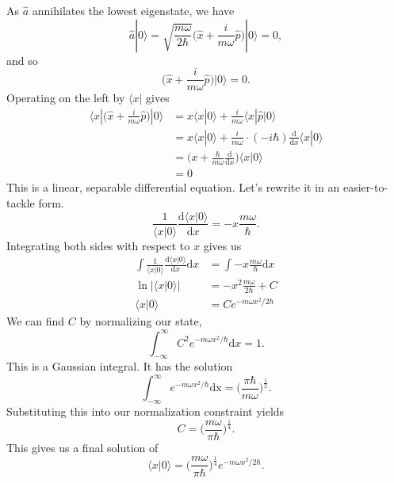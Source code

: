 \documentclass[../qft-for-the-gifted-amateur.tex]{subfiles}
\begin{document}
\begin{questions}
	\begin{solution}
		As $\hat{a}$ annihilates the lowest eigenstate, we have
		\[
			\hat{a}|0\rangle = \sqrt{\frac{m\omega}{2\hbar}}\Big(\hat{x} + \frac{i}{m\omega}\hat{p}\Big)|0\rangle = 0,
		\]
		and so
		\[
			\Big(\hat{x} + \frac{i}{m\omega}\hat{p}\Big)|0\rangle = 0.
		\]
		Operating on the left by $\langle x|$ gives
		\begin{align*}
		\langle x|\Big(\hat{x} + \frac{i}{m\omega}\hat{p}\Big)|0\rangle &= x\langle x|0\rangle + \frac{i}{m\omega}\langle x|\hat{p}|0\rangle \\
		&= x\langle x|0\rangle + \frac{i}{m\omega} \cdot ( - i\hbar)\frac{\mathrm{d}}{\mathrm{d}x}\langle x|0\rangle \\
		&= \Big(x + \frac{\hbar}{m\omega}\frac{\mathrm{d}}{\mathrm{d}x}\Big)\langle x|0\rangle \\
		&= 0
		\end{align*}
		This is a linear, separable differential equation. Let's rewrite it in
		an easier-to-tackle form.
		\[
			\frac{1}{\langle x|0\rangle}\frac{\mathrm{d}\langle x|0\rangle}{\mathrm{d}x} = - x\frac{m\omega}{\hbar}.
		\]
		Integrating both sides with respect to $x$ gives us
		\begin{align*}
		\int\frac{1}{\langle x|0\rangle}\frac{\mathrm{d}\langle x|0\rangle}{\mathrm{d}x}\mathrm{d}x &= \int - x\frac{m\omega}{\hbar}\mathrm{d}x \\
		\ln|\langle x|0\rangle| &= - x^{2}\frac{m\omega}{2\hbar} + C \\
		\langle x|0\rangle &= Ce^{- m\omega x^{2}/2\hbar}
		\end{align*}
		We can find $C$ by normalizing our state,
		\[
			\int_{- \infty}^{\infty}C^{2}e^{- m\omega x^{2}/\hbar}\mathrm{d}x = 1.
		\]
		This is a Gaussian integral. It has the solution
		\[
			\int_{- \infty}^{\infty}e^{- m\omega x^{2}/\hbar}\text{dx} = \Big(\frac{\pi\hbar}{m\omega}\Big)^{\frac{1}{2}}.
		\]
		Substituting this into our normalization constraint yields
		\[
			C = \Big(\frac{m\omega}{\pi\hbar}\Big)^{\frac{1}{4}}.
		\]
		This gives us a final solution of
		\[
			\langle x|0\rangle = \Big(\frac{m\omega}{\pi\hbar}\Big)^{\frac{1}{4}}e^{- m\omega x^{2}/2\hbar}.
		\]
	\end{solution}
	
\end{questions}
\end{document}
